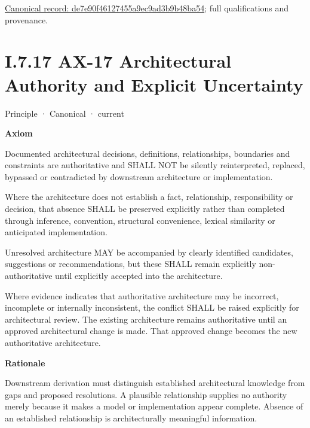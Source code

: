 {\footnotesize \href{../../../../continuum/motivation/principle/de7e90f46127455a9ec9ad3b9b48ba54.md}{Canonical record: de7e90f46127455a9ec9ad3b9b48ba54}; full qualifications and provenance.}\par
\section*{I.7.17 AX-17 Architectural Authority and Explicit Uncertainty}
\label{navigation:I.7.17}

\label{element:8882573df7ce43c6bc0f66da0a676139}
{\small Principle · Canonical · current}\par

\par\medskip\textbf{Axiom}\par


Documented architectural decisions, definitions, relationships, boundaries
and constraints are authoritative and SHALL NOT be silently reinterpreted,
replaced, bypassed or contradicted by downstream architecture or
implementation.



Where the architecture does not establish a fact, relationship,
responsibility or decision, that absence SHALL be preserved explicitly
rather than completed through inference, convention, structural
convenience, lexical similarity or anticipated implementation.



Unresolved architecture MAY be accompanied by clearly identified
candidates, suggestions or recommendations, but these SHALL remain
explicitly non-authoritative until explicitly accepted into the
architecture.



Where evidence indicates that authoritative architecture may be incorrect,
incomplete or internally inconsistent, the conflict SHALL be raised
explicitly for architectural review. The existing architecture remains
authoritative until an approved architectural change is made. That
approved change becomes the new authoritative architecture.



\par\medskip\textbf{Rationale}\par


Downstream derivation must distinguish established architectural knowledge
from gaps and proposed resolutions. A plausible relationship supplies no
authority merely because it makes a model or implementation appear
complete. Absence of an established relationship is architecturally
meaningful information.



